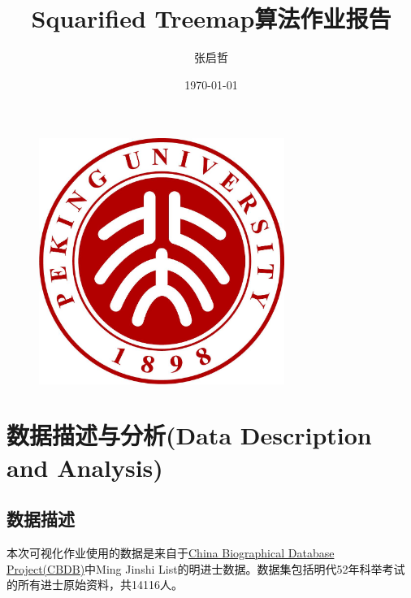 \documentclass[11pt]{article}
\title{\LARGE \bf Squarified Treemap算法作业报告}
\author{\LARGE 张启哲 \quad 1900011638}
\date{\Large \today}
\begin{document}
	\maketitle
	
	\vspace{40pt}
	
	\begin{figure}[h]
		\centering
		\includegraphics[width=8cm]{./figures/pku.jpg}
	\end{figure}

	\vspace{40pt}
	
	\renewcommand{\contentsname}{目录(Contents)}
	\renewcommand{\algorithmicrequire}{\textbf{Input:}}
	\renewcommand{\algorithmicensure}{\textbf{Output:}}
	
	\tableofcontents
	
	\thispagestyle{empty}
	
	\newpage
	
	\setcounter{page}{1}
	
	\section{数据描述与分析(Data Description and Analysis)}
	\subsection{数据描述}
	本次可视化作业使用的数据是来自于\href{https://projects.iq.harvard.edu/cbdb/data-sets}{China Biographical Database Project(CBDB)}中Ming Jinshi List的明进士数据。数据集包括明代52年科举考试的所有进士原始资料，共14116人。
	
	\hspace*{\fill} \\
	
\end{document}
